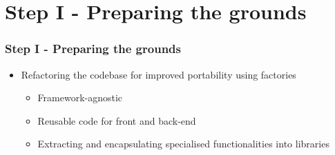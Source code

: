 \section{Step I - Preparing the grounds}
\begin{frame}
    \frametitle{Step I - Preparing the grounds}
    \begin{itemize}
        \item Refactoring the codebase for improved portability using factories
        \begin{itemize}
            \item Framework-agnostic
            \item Reusable code for front and back-end
            \item Extracting and encapsulating specialised functionalities into libraries
        \end{itemize}
    \end{itemize}


\end{frame}
